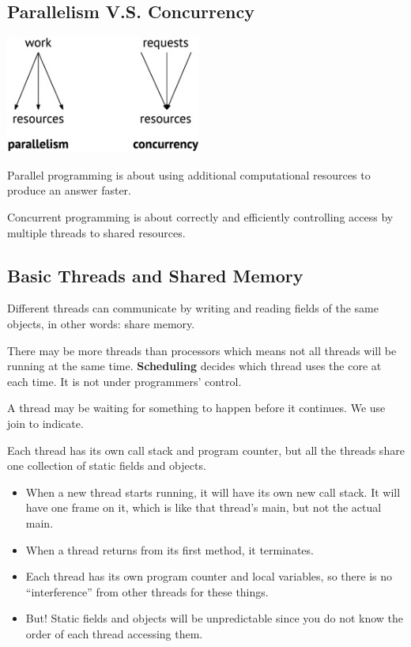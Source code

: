 \documentclass[letterpaper,12pt]{article}
\begin{document}
\subsection{Parallelism V.S. Concurrency}
\includegraphics*{./summary_image/parallelsim vs. concurrency.jpg}

Parallel programming is about using additional computational resources to produce an answer faster. 

Concurrent programming is about correctly and efficiently controlling access by multiple threads to shared resources.

\subsection{Basic Threads and Shared Memory}

Different threads can communicate by writing and reading fields of the same objects, in other words: share memory.

There may be more threads than processors which means not all threads will be running at the same time. \textbf{Scheduling} decides which thread uses the core at each time. It is not under programmers' control.

A thread may be waiting for something to happen before it continues. We use join to indicate.

Each thread has its own call stack and program counter, but all the threads share one collection of static fields and objects.
\begin{itemize}
      \item When a new thread starts running, it will have its own new call stack. It will have one frame on it, which is like that thread's main, but not the actual main.
      \item When a thread returns from its first method, it terminates.
      \item Each thread has its own program counter and local variables, so there is no ``interference'' from other threads for these things.
      \item But! Static fields and objects will be unpredictable since you do not know the order of each thread accessing them.
\end{itemize}
\end{document}
